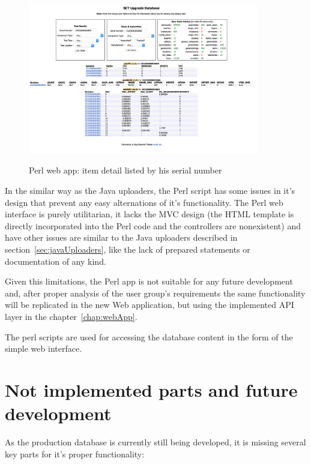 \begin{figure}[!ht]
	\centering
	\includegraphics[width=0.9\textwidth]{img/perlWebApp2.png}\\	
	\caption{Perl web app: item detail listed by his serial number}
\end{figure}

\par In the similar way as the Java uploaders, the Perl script has some issues in it's design that prevent any easy alternations of it's functionality. The Perl web interface is purely utilitarian, it lacks the MVC design (the HTML template is directly incorporated into the Perl code and the controllers are nonexistent) and have other issues are similar to the Java uploaders described in section~\ref{sec:javaUploaders}, like the lack of prepared statements or documentation of any kind.

\par Given this limitations, the Perl app is not suitable for any future development and, after proper analysis of the user group's requirements the same functionality will be replicated in the new Web application, but using the implemented API layer in the chapter~\ref{chap:webApp}.

\par The perl scripts are used for accessing the database content in the form of the simple web interface.


\section{Not implemented parts and future development}
\label{sec:notImplemented}
\par As the production database is currently still being developed, it is missing several key parts for it’s proper functionality:

